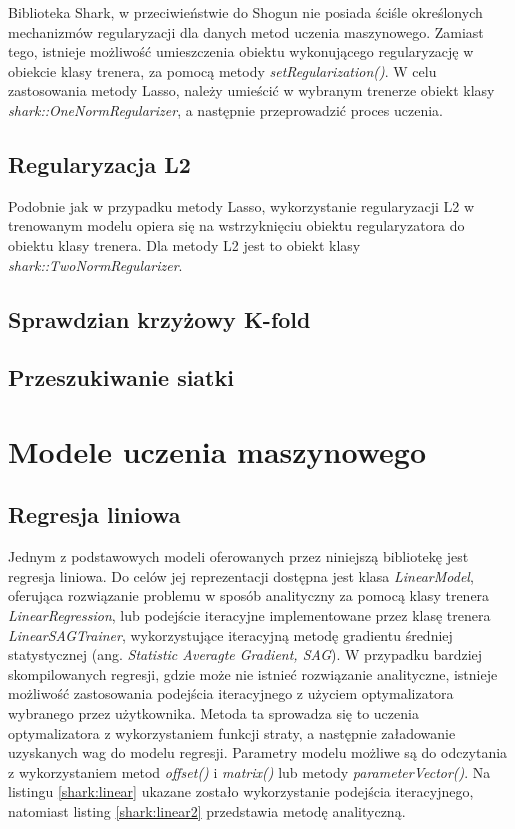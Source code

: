Biblioteka Shark, w przeciwieństwie do Shogun nie posiada ściśle określonych mechanizmów regularyzacji dla danych metod uczenia maszynowego. Zamiast tego, istnieje możliwość umieszczenia obiektu wykonującego regularyzację w obiekcie klasy trenera, za pomocą metody \textit{setRegularization()}. W celu zastosowania metody Lasso, należy umieścić w wybranym trenerze obiekt klasy \textit{shark::OneNormRegularizer}, a następnie przeprowadzić proces uczenia.

\subsection{Regularyzacja L2}

Podobnie jak w przypadku metody Lasso, wykorzystanie regularyzacji L2 w trenowanym modelu opiera się na wstrzyknięciu obiektu regularyzatora do obiektu klasy trenera. Dla metody L2 jest to obiekt klasy \textit{shark::TwoNormRegularizer}.

\subsection{Sprawdzian krzyżowy K-fold}



\subsection{Przeszukiwanie siatki}

\section{Modele uczenia maszynowego}

\subsection{Regresja liniowa}

Jednym z podstawowych modeli oferowanych przez niniejszą bibliotekę jest regresja liniowa. Do celów jej reprezentacji dostępna jest klasa \textit{LinearModel}, oferująca rozwiązanie problemu w sposób analityczny za pomocą klasy trenera \textit{LinearRegression}, lub podejście iteracyjne implementowane przez klasę trenera \textit{LinearSAGTrainer}, wykorzystujące iteracyjną metodę gradientu średniej statystycznej (ang. \textit{Statistic Averagte Gradient, SAG}). W przypadku bardziej skompilowanych regresji, gdzie może nie istnieć rozwiązanie analityczne, istnieje możliwość zastosowania podejścia iteracyjnego z użyciem optymalizatora wybranego przez użytkownika. Metoda ta sprowadza się to uczenia optymalizatora z wykorzystaniem funkcji straty, a następnie załadowanie uzyskanych wag do modelu regresji. Parametry modelu możliwe są do odczytania z wykorzystaniem metod \textit{offset()} i \textit{matrix()} lub metody \textit{parameterVector()}. Na listingu \ref{shark:linear} ukazane zostało wykorzystanie podejścia iteracyjnego, natomiast listing \ref{shark:linear2} przedstawia metodę analityczną.

